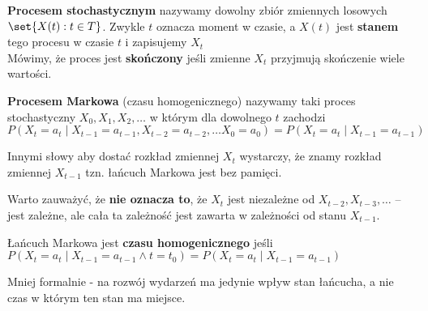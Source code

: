 \begin{definition}
	\textbf{Procesem stochastycznym} nazywamy dowolny zbiór zmiennych losowych \(\set{X(t) : t \in T}\).
	Zwykle \(t\) oznacza moment w czasie, a \(X(t)\) jest \textbf{stanem} tego procesu w czasie \(t\) i zapisujemy \(X_t\) \\
	Mówimy, że proces jest \textbf{skończony} jeśli zmienne \(X_t\) przyjmują skończenie wiele wartości.
\end{definition}

\begin{definition}
	\textbf{Procesem Markowa} (czasu homogenicznego) nazywamy taki proces stochastyczny \(X_0, X_1, X_2, \dots\) w którym dla dowolnego \(t\) zachodzi
	\[
		P(X_t = a_t \mid X_{t-1} = a_{t-1}, X_{t-2} = a_{t-2}, \dots X_0 = a_0) =
		P(X_t = a_t \mid X_{t-1} = a_{t-1})
	\]
\end{definition}

Innymi słowy aby dostać rozkład zmiennej \(X_t\) wystarczy, że znamy rozkład zmiennej \(X_{t-1}\) tzn. łańcuch Markowa jest bez pamięci.

Warto zauważyć, że \textbf{nie oznacza to}, że \(X_t\) jest niezależne od \(X_{t-2}, X_{t-3}, \dots\) --
jest zależne, ale cała ta zależność jest zawarta w zależności od stanu \(X_{t-1}\).

\begin{definition}
	Łańcuch Markowa jest \textbf{czasu homogenicznego} jeśli \(
	P(X_t = a_t \mid X_{t-1} = a_{t-1} \land t = t_0) = P(X_t = a_t \mid X_{t-1} = a_{t-1})
	\)
\end{definition}
Mniej formalnie - na rozwój wydarzeń ma jedynie wpływ stan łańcucha, a nie czas w którym ten stan ma miejsce.
